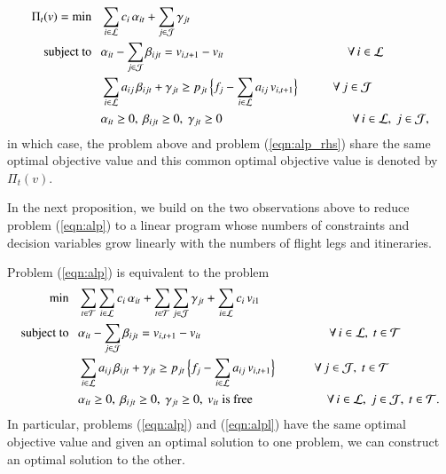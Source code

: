 %
%
\begin{subequations}
\label{eqn:alpr}
\begin{align}
\Pi_t(v) = \min~~~ & \sum_{i \in {\cal L}} c_i {\,} \alpha_{it} + \sum_{j \in {\cal J}} \gamma_{jt}
\label{eqn:alpr_obj}
\\
\mbox{subject to}~~~
&
\alpha_{it} 
- \sum_{j \in {\cal J}} \beta_{ijt}  = v_{i,t+1} - v_{it} 
\qquad \qquad \qquad  \qquad \qquad  \forall {\,} i \in {\cal L}
\label{eqn:alpr_fli}
\\
& 
\sum_{i \in {\cal L}} a_{ij} {\,} \beta_{ijt} + \gamma_{jt} \geq p_{jt} {\,} \Big\{ f_j - \sum_{i \in {\cal L}} a_{ij} {\,} v_{i,t+1} \Big\} \quad \quad ~~ {\,} {\,} \forall {\,} j \in {\cal J}
\label{eqn:alpr_itin}
\\
& \alpha_{it} \geq 0,~ \beta_{ijt} \geq 0,~ \gamma_{jt} \geq 0
\qquad \qquad \qquad \qquad \qquad {\,} {\,} {\,}\forall {\,} i \in {\cal L},~ j \in {\cal J},
\label{eqn:alpr_e}
\end{align}
\end{subequations}
%
%
in which case, the problem above and problem (\ref{eqn:alp_rhs}) share the same optimal objective value and this common optimal objective value is denoted by $\Pi_t(v)$.


In the next proposition, we build on the two observations above to reduce problem (\ref{eqn:alp}) to a linear program whose numbers of constraints and decision variables grow linearly with the numbers of flight legs and itineraries.  

\begin{pros}
\label{pro:eq}
%
Problem \textup{(\ref{eqn:alp})} is equivalent to the problem
%
%
\begin{subequations}
\label{eqn:alpl}
\begin{align}
\min~~~ & \sum_{t \in {\cal T}} \sum_{i \in {\cal L}} c_i {\,} \alpha_{it} + \sum_{t \in {\cal T}} \sum_{j \in {\cal J}} \gamma_{jt} + \sum_{i \in {\cal L}} c_i {\,} v_{i1}
\label{eqn:alpl_obj}
\\
\mbox{\textup{subject to}}~~~
&
\alpha_{it} 
- \sum_{j \in {\cal J}} \beta_{ijt}  = v_{i,t+1} - v_{it} 
\qquad \qquad \qquad  \qquad \qquad  {\,} {\,}  \forall {\,} i \in {\cal L},~ t \in {\cal T}
\label{eqn:alpl_fli}
\\
& 
\sum_{i \in {\cal L}} a_{ij} {\,} \beta_{ijt} + \gamma_{jt} \geq p_{jt} {\,} \Big\{ f_j - \sum_{i \in {\cal L}} a_{ij} {\,} v_{i,t+1} \Big\}  \quad \quad ~~~~{\,} \forall {\,} j \in {\cal J},~t \in {\cal T}
\label{eqn:alpl_itin}
\\
& \alpha_{it} \geq 0,~ \beta_{ijt} \geq 0,~ \gamma_{jt} \geq 0,~ v_{it} \mbox{ \textup{is free}}
\qquad \qquad \qquad   \forall {\,} i \in {\cal L},~ j \in {\cal J},~t \in {\cal T}.
\label{eqn:alpl_e}
\end{align}
\end{subequations}
%
%
In particular, problems \textup{(\ref{eqn:alp})} and \textup{(\ref{eqn:alpl})} have the same optimal objective value and given an optimal solution to one problem, we can construct an optimal solution to the other.
%
\end{pros}


